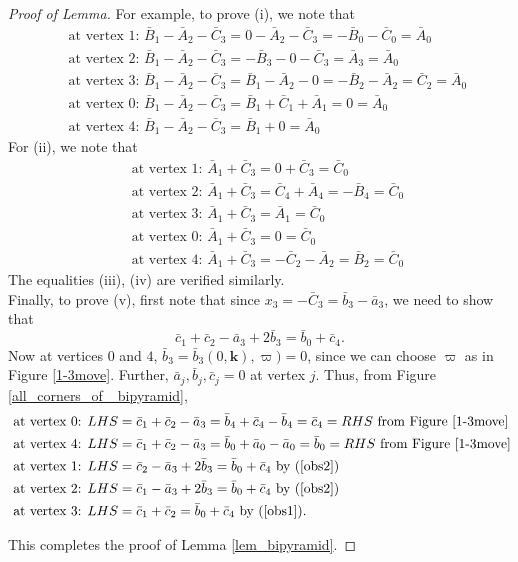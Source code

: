 \documentclass[12pt]{amsart}
\theoremstyle{definition}
\theoremstyle{remark}
\def\kk{\boldsymbol{k}}
\begin{document}
\begin{proof}[Proof of Lemma]
 For example, to prove (i), we note that
\begin{align*} 
&\text{ at vertex 1: }  \bar B_1-\bar A_2-\bar C_3 = 0 - \bar A_2-\bar C_3 = - \bar B_0 - \bar C_0 = \bar A_0  \\
&\text{ at vertex 2: }  \bar B_1-\bar A_2-\bar C_3 =  - \bar B_3 - 0 - \bar C_3 = \bar A_3 =  \bar A_0 \\
&\text{ at vertex 3: }  \bar B_1-\bar A_2-\bar C_3 = \bar B_1 - \bar A_2 - 0 = - \bar B_2 -\bar A_2 = \bar C_2 = \bar A_0 \\
&\text{ at vertex 0: } \bar B_1-\bar A_2-\bar C_3 = \bar B_1 +\bar C_1+\bar A_1 = 0 = \bar A_0\\
&\text{ at vertex 4: } \bar B_1-\bar A_2-\bar C_3 = \bar B_1 + 0 = \bar A_0
\end{align*}
For (ii), we note that
\begin{align*} 
&\text{ at vertex 1: }  \bar A_1+\bar C_3 = 0+\bar C_3 = \bar C_0  \\
&\text{ at vertex 2: }  \bar A_1+\bar C_3 = \bar C_4 +\bar A_4 = - \bar B_4 = \bar C_0 \\
&\text{ at vertex 3: }  \bar A_1+\bar C_3 = \bar A_1 = \bar C_0 \\
&\text{ at vertex 0: } \bar A_1+\bar C_3 = 0 = \bar C_0\\
&\text{ at vertex 4: } \bar A_1+\bar C_3 = -\bar C_2 - \bar A_2 = \bar B_2 = \bar C_0
\end{align*}
The equalities (iii), (iv) are verified similarly.\\

Finally, to prove (v),
first note that since $x_3 = -\bar C_3 = \bar b_3-\bar a_3$, we need to show that
$$\bar c_1+ \bar c_2 - \bar a_3 + 2 \bar b_3 = \bar b_0 + \bar c_4.$$
Now at vertices $0$ and $4$, 
 $\bar b_3 = \bar b_3(0,\kk),\varpi) = 0$,
 since we can choose $\varpi$ as in Figure \ref{1-3move}.
Further, $\bar a_j,\bar b_j,\bar c_j=0$ at vertex $j$. Thus, from Figure \ref{all_corners_of_ bipyramid},
\begin{align*} 
&\text{ at vertex 0: } LHS=\bar c_1+\bar c_2-\bar a_3=\bar b_4+\bar c_4-\bar b_4=\bar c_4 = RHS  \text{ from Figure \ref{1-3move}}\\
&\text{ at vertex 4: } LHS = \bar c_1+\bar c_2-\bar a_3=\bar b_0+\bar a_0-\bar a_0= \bar b_0= RHS  \text{ from Figure \ref{1-3move}} \\
&\text{ at vertex 1: }  LHS = \bar c_2 - \bar a_3 + 2 \bar b_3 = \bar b_0 + \bar c_4  \text{  by (\ref{obs2})}  \\
&\text{ at vertex 2: }  LHS = \bar c_1-\bar a_3+2\bar b_3=\bar b_0+\bar c_4  \text{  by (\ref{obs2})}  \\
&\text{ at vertex 3: }  LHS = \bar c_1 +\bar c_2 = \bar b_0+\bar c_4   \text{  by (\ref{obs1})}.
\end{align*}

This completes the proof of  Lemma \ref{lem_bipyramid}.
\end{proof}






\end{document}
